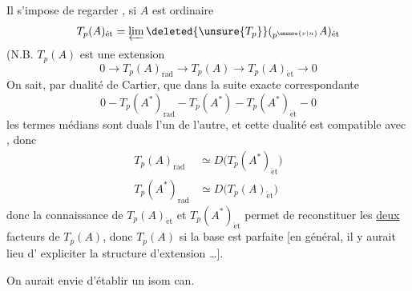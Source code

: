 Il s'impose de regarder , si $A$ est ordinaire
\[
T_p(A)_{\mathrm{\acute et}}=\varprojlim\deleted{\unsure{T_p}}({}_{p^{\unsure{\nu|n}}}A)_{\mathrm{\acute et}}
\]
(N.B. $T_p(A)$ est une extension
\[
0\to T_p(A)_{\mathrm{rad}}\to T_p(A)\mathbin{\to}T_p(A)_{\mathrm{\acute et}}\to0
\]
On sait, par dualité de Cartier, que dans la
suite exacte correspondante
\[
0\mathbin{-}T_p(A^*)_{\mathrm{rad}}\mathbin{-}T_p(A^*)\mathbin{-}T_p(A^*)_{\mathrm{\acute et}}\mathbin{-}0
\]
les termes médians sont duals l'un de
l'autre, et  cette dualité est
compatible avec , donc
\[
\begin{aligned}
T_p(A)_{\mathrm{rad}}&\simeq D\bigl(T_p(A^*)_{\mathrm{\acute et}}\bigr)\\
T_p(A^*)_{\mathrm{rad}}&\simeq D\bigl(T_p(A)_{\mathrm{\acute et}}\bigr)
\end{aligned}
\]
donc la connaissance de $T_p(A)_{\mathrm{\acute et}}$ et $T_p(A^*)_{\mathrm{\acute et}}$
permet de reconstituer les \uline{deux} facteurs
de $T_p(A)$, donc $T_p(A)$ si la base est
parfaite [en général, il y aurait lieu d'
expliciter la structure d'extension \ldots].

On aurait envie d'établir un isom can.
